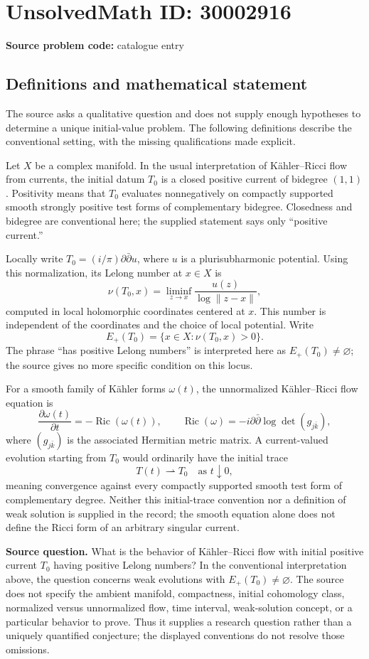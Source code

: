 \documentclass[11pt]{article}
\begin{document}
\section*{UnsolvedMath ID: 30002916}
\textbf{Source problem code:} catalogue entry
\subsection{Definitions and mathematical statement}
The source asks a qualitative question and does not supply enough hypotheses to determine a unique initial-value problem. The following definitions describe the conventional setting, with the missing qualifications made explicit.

Let \(X\) be a complex manifold. In the usual interpretation of Kähler--Ricci flow from currents, the initial datum \(T_0\) is a closed positive current of bidegree \((1,1)\). Positivity means that \(T_0\) evaluates nonnegatively on compactly supported smooth strongly positive test forms of complementary bidegree. Closedness and bidegree are conventional here; the supplied statement says only ``positive current.''

Locally write \(T_0=(i/\pi)\partial\bar\partial u\), where \(u\) is a plurisubharmonic potential. Using this normalization, its Lelong number at \(x\in X\) is
\[
\nu(T_0,x)=\liminf_{z\to x}\frac{u(z)}{\log\lVert z-x\rVert},
\]
computed in local holomorphic coordinates centered at \(x\). This number is independent of the coordinates and the choice of local potential. Write
\[
E_+(T_0)=\{x\in X:\nu(T_0,x)>0\}.
\]
The phrase ``has positive Lelong numbers'' is interpreted here as \(E_+(T_0)\ne\varnothing\); the source gives no more specific condition on this locus.

For a smooth family of Kähler forms \(\omega(t)\), the unnormalized Kähler--Ricci flow equation is
\[
\frac{\partial\omega(t)}{\partial t}=-\operatorname{Ric}(\omega(t)),
\qquad
\operatorname{Ric}(\omega)=-i\partial\bar\partial\log\det(g_{j\bar k}),
\]
where \((g_{j\bar k})\) is the associated Hermitian metric matrix. A current-valued evolution starting from \(T_0\) would ordinarily have the initial trace
\[
T(t)\rightharpoonup T_0\quad\text{as }t\downarrow0,
\]
meaning convergence against every compactly supported smooth test form of complementary degree. Neither this initial-trace convention nor a definition of weak solution is supplied in the record; the smooth equation alone does not define the Ricci form of an arbitrary singular current.

\textbf{Source question.} What is the behavior of Kähler--Ricci flow with initial positive current \(T_0\) having positive Lelong numbers? In the conventional interpretation above, the question concerns weak evolutions with \(E_+(T_0)\ne\varnothing\). The source does not specify the ambient manifold, compactness, initial cohomology class, normalized versus unnormalized flow, time interval, weak-solution concept, or a particular behavior to prove. Thus it supplies a research question rather than a uniquely quantified conjecture; the displayed conventions do not resolve those omissions.
\end{document}
